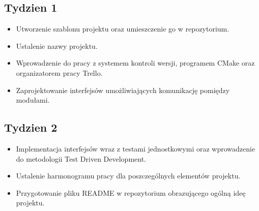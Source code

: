 \documentclass[11pt]{article}
\begin{document}
\subsection{Tydzien 1}
\begin{itemize}
\item Utworzenie szablonu projektu oraz umieszczenie go w repozytorium.
\item Ustalenie nazwy projektu.
\item Wprowadzenie do pracy z systemem kontroli wersji, programem CMake oraz organizatorem pracy Trello.
\item Zaprojektowanie interfejsów umożliwiających komunikację pomiędzy modułami.
\end{itemize}

\subsection{Tydzien 2}
\begin{itemize}
\item Implementacja interfejsów wraz z testami jednostkowymi oraz wprowadzenie do metodologii Test Driven Development.
\item Ustalenie harmonogramu pracy dla poszczególnych elementów projektu.
\item Przygotowanie pliku README w repozytorium obrazującego ogólną ideę projektu.
\end{itemize}
\end{document}
